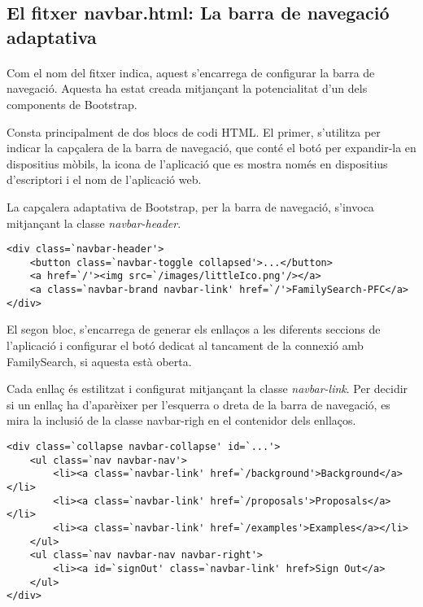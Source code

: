\subsection{El fitxer navbar.html: La barra de navegació adaptativa}

    \paragraph{}
    Com el nom del fitxer indica, aquest s'encarrega de configurar la barra de navegació. Aquesta ha estat creada mitjançant la potencialitat d'un dels components de Bootstrap.

    Consta principalment de dos blocs de codi HTML. El primer, s'utilitza per indicar la capçalera de la barra de navegació, que conté el botó per expandir-la en dispositius mòbils, la icona de l'aplicació que es mostra només en dispositius d'escriptori i el nom de l'aplicació web.

    La capçalera adaptativa de Bootstrap, per la barra de navegació, s'invoca mitjançant la classe \emph{navbar-header}.

    \begin{lstlisting}[style=rawOwn,caption={Capçalera de la barra de navegació}]
<div class=`navbar-header'>
    <button class=`navbar-toggle collapsed'>...</button>
    <a href=`/'><img src=`/images/littleIco.png'/></a>
    <a class=`navbar-brand navbar-link' href=`/'>FamilySearch-PFC</a>
</div>
    \end{lstlisting}

    El segon bloc, s'encarrega de generar els enllaços a les diferents seccions de l'aplicació i configurar el botó dedicat al tancament de la connexió amb FamilySearch, si aquesta està oberta.

    Cada enllaç és estilitzat i configurat mitjançant la classe \emph{navbar-link}. Per decidir si un enllaç ha d'aparèixer per l'esquerra o dreta de la barra de navegació, es mira la inclusió de la classe navbar-righ en el contenidor dels enllaços.

    \begin{lstlisting}[style=rawOwn,caption={Enllaços de la barra de navegació}]
<div class=`collapse navbar-collapse' id=`...'>
	<ul class=`nav navbar-nav'>
		<li><a class=`navbar-link' href=`/background'>Background</a></li>
		<li><a class=`navbar-link' href=`/proposals'>Proposals</a></li>
		<li><a class=`navbar-link' href=`/examples'>Examples</a></li>
	</ul>
	<ul class=`nav navbar-nav navbar-right'>
		<li><a id=`signOut' class=`navbar-link' href>Sign Out</a>
	</ul>
</div>
    \end{lstlisting}
